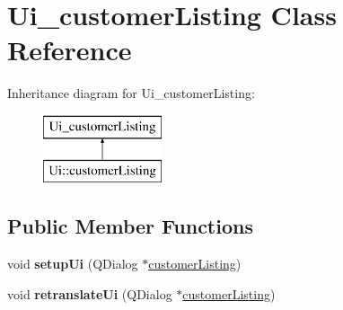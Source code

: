 \hypertarget{class_ui__customer_listing}{}\section{Ui\+\_\+customer\+Listing Class Reference}
\label{class_ui__customer_listing}
Inheritance diagram for Ui\+\_\+customer\+Listing\+:\begin{figure}[H]
\begin{center}
\leavevmode
\includegraphics[height=2.000000cm]{class_ui__customer_listing}
\end{center}
\end{figure}
\subsection*{Public Member Functions}
\begin{DoxyCompactItemize}
\item 
\mbox{\label{class_ui__customer_listing_acb479d6d68fafdca3c284726d0117add}} 
void {\bfseries setup\+Ui} (Q\+Dialog $\ast$\mbox{\hyperlink{classcustomer_listing}{customer\+Listing}})
\item 
\mbox{\label{class_ui__customer_listing_a617f942f355bf6b0cec7cc9e95d735c9}} 
void {\bfseries retranslate\+Ui} (Q\+Dialog $\ast$\mbox{\hyperlink{classcustomer_listing}{customer\+Listing}})
\end{DoxyCompactItemize}
